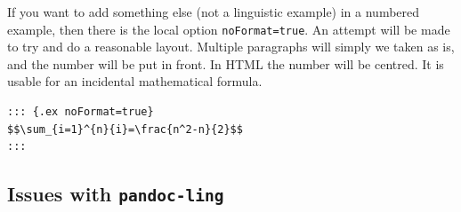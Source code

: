 \documentclass[
]{article}
\begin{document}
If you want to add something else (not a linguistic example) in a
numbered example, then there is the local option \texttt{noFormat=true}.
An attempt will be made to try and do a reasonable layout. Multiple
paragraphs will simply we taken as is, and the number will be put in
front. In HTML the number will be centred. It is usable for an
incidental mathematical formula.

\begin{verbatim}
::: {.ex noFormat=true}
$$\sum_{i=1}^{n}{i}=\frac{n^2-n}{2}$$
:::
\end{verbatim}

\begin{samepage}
\begin{exe} \judgewidth{}
  \ex [] { \[\sum_{i=1}^{n}{i}=\frac{n^2-n}{2}\]\\
   }
  \label{ex:4.14}
\end{exe}
\end{samepage}

\hypertarget{issues-with-pandoc-ling}{%
\subsection{\texorpdfstring{Issues with
\texttt{pandoc-ling}}{Issues with pandoc-ling}}\label{issues-with-pandoc-ling}}
\end{document}
